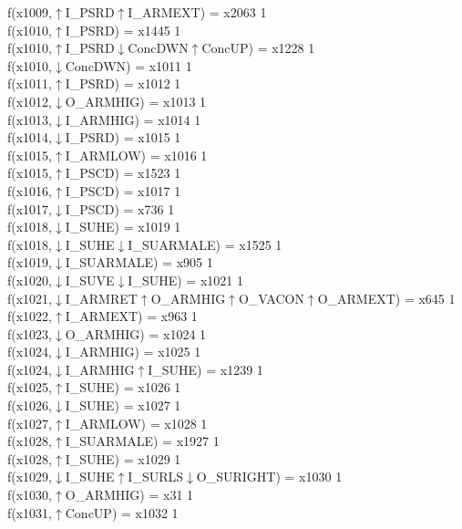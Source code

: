 f(x1009,$\uparrow$I\_PSRD$\uparrow$I\_ARMEXT) = x2063 {1} \\
f(x1010,$\uparrow$I\_PSRD) = x1445 {1} \\
f(x1010,$\uparrow$I\_PSRD$\downarrow$ConcDWN$\uparrow$ConcUP) = x1228 {1} \\
f(x1010,$\downarrow$ConcDWN) = x1011 {1} \\
f(x1011,$\uparrow$I\_PSRD) = x1012 {1} \\
f(x1012,$\downarrow$O\_ARMHIG) = x1013 {1} \\
f(x1013,$\downarrow$I\_ARMHIG) = x1014 {1} \\
f(x1014,$\downarrow$I\_PSRD) = x1015 {1} \\
f(x1015,$\uparrow$I\_ARMLOW) = x1016 {1} \\
f(x1015,$\uparrow$I\_PSCD) = x1523 {1} \\
f(x1016,$\uparrow$I\_PSCD) = x1017 {1} \\
f(x1017,$\downarrow$I\_PSCD) = x736 {1} \\
f(x1018,$\downarrow$I\_SUHE) = x1019 {1} \\
f(x1018,$\downarrow$I\_SUHE$\downarrow$I\_SUARMALE) = x1525 {1} \\
f(x1019,$\downarrow$I\_SUARMALE) = x905 {1} \\
f(x1020,$\downarrow$I\_SUVE$\downarrow$I\_SUHE) = x1021 {1} \\
f(x1021,$\downarrow$I\_ARMRET$\uparrow$O\_ARMHIG$\uparrow$O\_VACON$\uparrow$O\_ARMEXT) = x645 {1} \\
f(x1022,$\uparrow$I\_ARMEXT) = x963 {1} \\
f(x1023,$\downarrow$O\_ARMHIG) = x1024 {1} \\
f(x1024,$\downarrow$I\_ARMHIG) = x1025 {1} \\
f(x1024,$\downarrow$I\_ARMHIG$\uparrow$I\_SUHE) = x1239 {1} \\
f(x1025,$\uparrow$I\_SUHE) = x1026 {1} \\
f(x1026,$\downarrow$I\_SUHE) = x1027 {1} \\
f(x1027,$\uparrow$I\_ARMLOW) = x1028 {1} \\
f(x1028,$\uparrow$I\_SUARMALE) = x1927 {1} \\
f(x1028,$\uparrow$I\_SUHE) = x1029 {1} \\
f(x1029,$\downarrow$I\_SUHE$\uparrow$I\_SURLS$\downarrow$O\_SURIGHT) = x1030 {1} \\
f(x1030,$\uparrow$O\_ARMHIG) = x31 {1} \\
f(x1031,$\uparrow$ConcUP) = x1032 {1} \\
